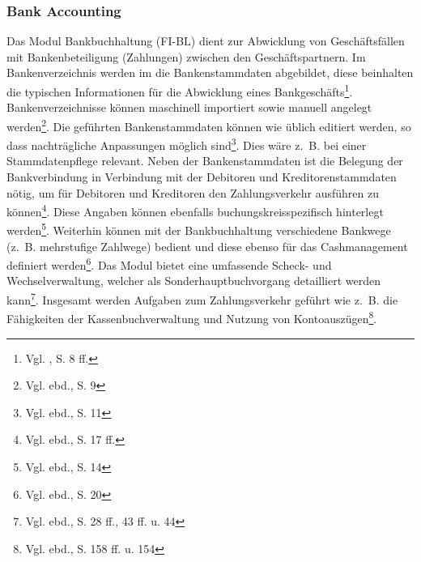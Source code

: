 \subsubsection{Bank Accounting} 
Das Modul Bankbuchhaltung (FI-BL) dient zur Abwicklung von Geschäftsfällen mit Bankenbeteiligung (Zahlungen) zwischen den Geschäftspartnern. 
Im Bankenverzeichnis werden im die Bankenstammdaten abgebildet, diese beinhalten die typischen Informationen für die Abwicklung eines Bankgeschäfts\footnote{Vgl. \cite{SAPFIBL2001}, S. 8 ff.}. Bankenverzeichnisse können maschinell importiert sowie manuell angelegt werden\footnote{Vgl. ebd., S. 9}. Die geführten Bankenstammdaten können wie üblich editiert werden, so dass nachträgliche Anpassungen möglich sind\footnote{Vgl. ebd., S. 11}. Dies wäre z.~B. bei einer Stammdatenpflege relevant. Neben der Bankenstammdaten ist die Belegung der Bankverbindung in Verbindung mit der Debitoren und Kreditorenstammdaten nötig, um für Debitoren und Kreditoren den Zahlungsverkehr ausführen zu können\footnote{Vgl. ebd., S. 17 ff.}. Diese Angaben können ebenfalls buchungskreisspezifisch hinterlegt werden\footnote{Vgl. ebd., S. 14}. 
Weiterhin können mit der Bankbuchhaltung verschiedene Bankwege (z.~B. mehrstufige Zahlwege) bedient und diese ebenso für das Cashmanagement definiert werden\footnote{Vgl. ebd., S. 20}. Das Modul bietet eine umfassende Scheck- und Wechselverwaltung, welcher als Sonderhauptbuchvorgang detailliert werden kann\footnote{Vgl. ebd., S. 28 ff., 43 ff. u. 44}. Insgesamt werden Aufgaben zum Zahlungsverkehr geführt wie z.~B. die Fähigkeiten der Kassenbuchverwaltung und  Nutzung von Kontoauszügen\footnote{Vgl. ebd., S. 158 ff. u. 154}.

